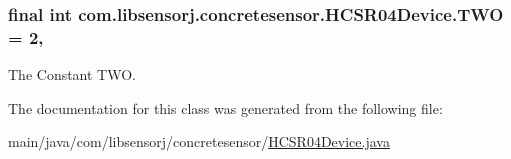 \subsubsection[{T\+W\+O}]{\setlength{\rightskip}{0pt plus 5cm}final int com.\+libsensorj.\+concretesensor.\+H\+C\+S\+R04\+Device.\+T\+W\+O = 2\hspace{0.3cm}{\ttfamily [static]}, {\ttfamily [private]}}\label{classcom_1_1libsensorj_1_1concretesensor_1_1HCSR04Device_a8f69accf3efa61a642b5e8693f7f158a}
The Constant T\+W\+O. 

The documentation for this class was generated from the following file\+:\begin{DoxyCompactItemize}
\item 
main/java/com/libsensorj/concretesensor/\hyperlink{HCSR04Device_8java}{H\+C\+S\+R04\+Device.\+java}\end{DoxyCompactItemize}
